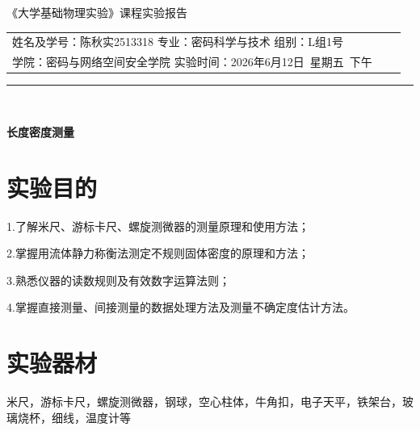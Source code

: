 \documentclass[12pt,a4paper]{article}
\begin{document}
	\begin{center}
		\heiti\LARGE{《大学基础物理实验》课程实验报告}
	\end{center}
	\begin{center}
		\begin{tabular}{lcr}
			{\songti 姓名及学号：陈秋实2513318}  \quad 专业：密码科学与技术 \quad 组别：L组1号 \\
			{\songti  学院：密码与网络空间安全学院 \quad 实验时间：2026年6月12日~星期五~下午}\\
		\end{tabular}
	\end{center}
	\vspace{-0.2cm}
	{\noindent}	 \rule[-10pt]{16cm}{0.05em}\\
	\vspace{-0.4cm}

	\begin{center}
		\LARGE\textbf{长度密度测量}
	\end{center}
	
	
	\section{实验目的}
	\par 1.了解米尺、游标卡尺、螺旋测微器的测量原理和使用方法；
	\par 2.掌握用流体静力称衡法测定不规则固体密度的原理和方法；
	\par 3.熟悉仪器的读数规则及有效数字运算法则；
	\par 4.掌握直接测量、间接测量的数据处理方法及测量不确定度估计方法。

	
	\section{实验器材}
	\par 米尺，游标卡尺，螺旋测微器，钢球，空心柱体，牛角扣，电子天平，铁架台，玻璃烧杯，细线，温度计等
	
\end{document}
